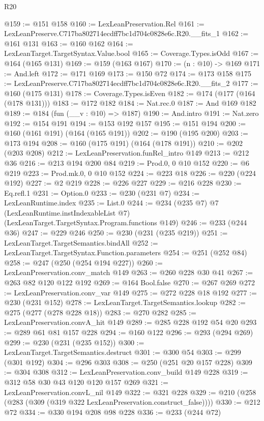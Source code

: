 \begin{lexlean}{R20}
\begin{coremodule}
@159 := @151 @158
@160 := LexLeanPreservation.Rel
@161 := LexLeanPreserve.C717ba802714ecdff7bc1d704c0828e6c.R20.__fits_1
@162 := @161 @131
@163 := @160 @162
@164 := LexLeanTarget.TargetSyntax.Value.bool
@165 := Coverage.Types.isOdd
@167 := @164 (@165 @131)
@169 := @159 (@163 @167)
@170 := (n : @10) -> @169
@171 := And.left
@172 := @171 @169
@173 := @150 @72
@174 := @173 @158
@175 := LexLeanPreserve.C717ba802714ecdff7bc1d704c0828e6c.R20.__fits_2
@177 := @160 (@175 @131)
@178 := Coverage.Types.isEven
@182 := @174 (@177 (@164 (@178 @131)))
@183 := @172 @182
@184 := Nat.rec.{0}
@187 := And @169 @182
@189 := @184 (fun (__v : @10) => @187)
@190 := And.intro
@191 := Nat.zero
@192 := @154 @191
@194 := @153 @192 @157
@195 := @151 @194
@200 := @160 (@161 @191) (@164 (@165 @191))
@202 := @190 (@195 @200)
@203 := @173 @194
@208 := @160 (@175 @191) (@164 (@178 @191))
@210 := @202 (@203 @208)
@212 := LexLeanPreservation.funRel_intro @149
@213 := @212 @36
@216 := @213 @194 @200 @84
@219 := Prod.{0, 0} @10 @152
@220 := @6 @219
@223 := Prod.mk.{0, 0} @10 @152
@224 := @223 @18
@226 := @220 (@224 @192)
@227 := @2 @219
@228 := @226 @227
@229 := @216 @228
@230 := Eq.refl.{1}
@231 := Option.{0}
@233 := @230 (@231 @7)
@234 := LexLeanRuntime.index
@235 := List.{0}
@244 := @234
    (@235 @7)
    @7
    (LexLeanRuntime.instIndexableList @7)
    (LexLeanTarget.TargetSyntax.Program.functions @149)
@246 := @233 (@244 @36)
@247 := @229 @246
@250 := @230 (@231 (@235 @219))
@251 := LexLeanTarget.TargetSemantics.bindAll
@252 := LexLeanTarget.TargetSyntax.Function.parameters
@254 := @251 (@252 @84)
@258 := @247 (@250 (@254 @194 @227))
@260 := LexLeanPreservation.conv_match @149
@263 := @260 @228 @30 @41
@267 := @263 @82 @120 @122 @192
@269 := @164 Bool.false
@270 := @267 @269
@272 := LexLeanPreservation.conv_var @149
@275 := @272 @228 @18 @192
@277 := @230 (@231 @152)
@278 := LexLeanTarget.TargetSemantics.lookup
@282 := @275 (@277 (@278 @228 @18))
@283 := @270 @282
@285 := LexLeanPreservation.convA_hit @149
@289 := @285 @228 @192 @54 @20
@293 := @289 @61 @81 @157 @228
@294 := @160 @122
@296 := @293 (@294 @269)
@299 := @230 (@231 (@235 @152))
@300 := LexLeanTarget.TargetSemantics.destruct
@301 := @300 @54
@303 := @299 (@301 @192)
@304 := @296 @303
@308 := @250 (@251 @20 @157 @228)
@309 := @304 @308
@312 := LexLeanPreservation.conv_build @149 @228
@319 := @312 @58 @30 @43 @120 @120 @157 @269
@321 := LexLeanPreservation.convL_nil @149
@322 := @321 @228
@329 := @210 (@258 (@283 (@309 (@319 @322 LexLeanPreservation.construct_false))))
@330 := @212 @72
@334 := @330 @194 @208 @98 @228
@336 := @233 (@244 @72)

\end{coremodule}
\end{lexlean}
